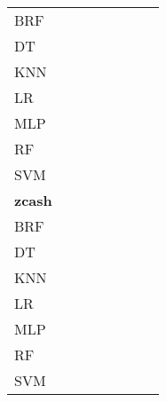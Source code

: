 \documentclass{article}
\begin{document}
{\begin{tabular}{|l|c|c|c|c|c|c|c|}
BRF & \cellcolor{gray}  & \cellcolor{white}  & \cellcolor{white}  & \cellcolor{white}  & \cellcolor{white}  & \cellcolor{white}  & \cellcolor{black}  \\ 
DT & \cellcolor{white}  & \cellcolor{gray}  & \cellcolor{white}  & \cellcolor{white}  & \cellcolor{white}  & \cellcolor{white}  & \cellcolor{white}  \\ 
KNN & \cellcolor{white}  & \cellcolor{black}  & \cellcolor{gray}  & \cellcolor{black}  & \cellcolor{white}  & \cellcolor{white}  & \cellcolor{black}  \\ 
LR & \cellcolor{white}  & \cellcolor{white}  & \cellcolor{white}  & \cellcolor{gray}  & \cellcolor{white}  & \cellcolor{white}  & \cellcolor{white}  \\ 
MLP & \cellcolor{white}  & \cellcolor{white}  & \cellcolor{white}  & \cellcolor{white}  & \cellcolor{gray}  & \cellcolor{white}  & \cellcolor{white}  \\ 
RF & \cellcolor{white}  & \cellcolor{white}  & \cellcolor{white}  & \cellcolor{white}  & \cellcolor{black}  & \cellcolor{gray}  & \cellcolor{black}  \\ 
SVM & \cellcolor{white}  & \cellcolor{black}  & \cellcolor{white}  & \cellcolor{black}  & \cellcolor{white}  & \cellcolor{white}  & \cellcolor{gray}  \\ 
\hline
\textbf{zcash} \\ \hline
BRF & \cellcolor{gray}  & \cellcolor{white}  & \cellcolor{white}  & \cellcolor{white}  & \cellcolor{black}  & \cellcolor{white}  & \cellcolor{black}  \\ 
DT & \cellcolor{white}  & \cellcolor{gray}  & \cellcolor{white}  & \cellcolor{black}  & \cellcolor{black}  & \cellcolor{white}  & \cellcolor{white}  \\ 
KNN & \cellcolor{white}  & \cellcolor{black}  & \cellcolor{gray}  & \cellcolor{black}  & \cellcolor{black}  & \cellcolor{white}  & \cellcolor{black}  \\ 
LR & \cellcolor{white}  & \cellcolor{white}  & \cellcolor{white}  & \cellcolor{gray}  & \cellcolor{white}  & \cellcolor{white}  & \cellcolor{white}  \\ 
MLP & \cellcolor{white}  & \cellcolor{white}  & \cellcolor{white}  & \cellcolor{white}  & \cellcolor{gray}  & \cellcolor{white}  & \cellcolor{white}  \\ 
RF & \cellcolor{white}  & \cellcolor{white}  & \cellcolor{white}  & \cellcolor{black}  & \cellcolor{black}  & \cellcolor{gray}  & \cellcolor{black}  \\ 
SVM & \cellcolor{white}  & \cellcolor{white}  & \cellcolor{white}  & \cellcolor{black}  & \cellcolor{white}  & \cellcolor{white}  & \cellcolor{gray}  \\ 

\end{tabular}}
\end{document}
